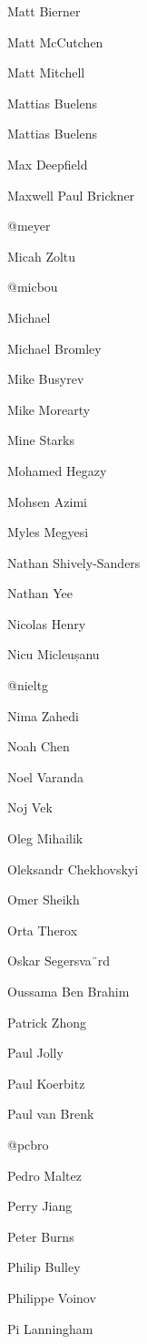 \begin{DoxyItemize}
\item Matt Bierner
\item Matt Mc\+Cutchen
\item Matt Mitchell
\item Mattias Buelens
\item Mattias Buelens
\item Max Deepfield
\item Maxwell Paul Brickner
\item @meyer
\item Micah Zoltu
\item @micbou
\item Michael
\item Michael Bromley
\item Mike Busyrev
\item Mike Morearty
\item Mine Starks
\item Mohamed Hegazy
\item Mohsen Azimi
\item Myles Megyesi
\item Nathan Shively-\/\+Sanders
\item Nathan Yee
\item Nicolas Henry
\item Nicu Micleușanu
\item @nieltg
\item Nima Zahedi
\item Noah Chen
\item Noel Varanda
\item Noj Vek
\item Oleg Mihailik
\item Oleksandr Chekhovskyi
\item Omer Sheikh
\item Orta Therox
\item Oskar Segersva¨rd
\item Oussama Ben Brahim
\item Patrick Zhong
\item Paul Jolly
\item Paul Koerbitz
\item Paul van Brenk
\item @pcbro
\item Pedro Maltez
\item Perry Jiang
\item Peter Burns
\item Philip Bulley
\item Philippe Voinov
\item Pi Lanningham

\end{DoxyItemize}
